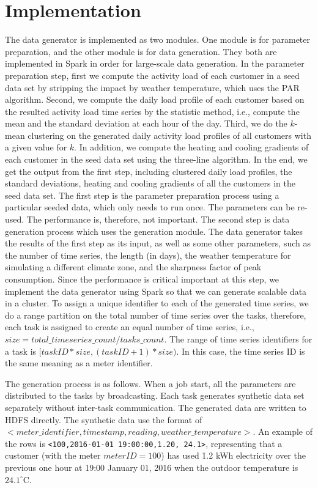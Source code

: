 \documentclass[a4paper,12pt]{llncs}
\newcommand{\ie}{i.e.}
\begin{document}
\section{Implementation}
The data generator is implemented as two modules. One module is for parameter preparation, and the other module is for data generation. They both are implemented in Spark in order for large-scale data generation. In the parameter preparation step, first we compute the activity load of each customer in a seed data set by stripping the impact by weather temperature, which uses the PAR algorithm. Second, we compute the daily load profile of each customer based on the resulted activity load time series by the statistic method, \ie, compute the mean and the standard deviation at each hour of the day. Third, we do the $k$-mean clustering on the generated daily activity load profiles of all customers with a given value for $k$. In addition, we  compute the heating and cooling gradients of each customer in the seed data set using the three-line algorithm. In the end, we get the  output from the first step, including clustered daily load profiles, the standard deviations, heating and cooling gradients of all the customers in the seed data set. The first step is the parameter preparation process using a particular seeded data, which only needs to run once. The parameters can be re-used. The performance is, therefore, not important. The second step is data generation process which uses the  generation module. The data generator takes the results of the first step as its input, as well as some other parameters, such as the number of time series, the length (in days), the weather temperature for simulating a different climate zone, and the sharpness factor of peak consumption.  Since the performance is critical important at this step,  we implement the data generator using Spark so that we can generate scalable data in a cluster. To assign a unique identifier to each of the generated time series, we do a range partition on the total number of time series over the tasks, therefore, each task is assigned to create an equal number of time series, \ie, $size=total\_timeseries\_count/tasks\_count$. The range of time series identifiers for a task is $[taskID*size, (taskID+1)*size)$. In this case, the time series ID is the same meaning as a meter identifier.

The generation process is as follows. When a job start, all the parameters are distributed to the tasks by broadcasting. Each task generates synthetic data set separately without inter-task communication. The generated data are written to HDFS directly. The synthetic data use the format of $<meter\_identifier, timestamp, reading, weather\_temperature>$. An example of the rows is \texttt{<100,2016-01-01 19:00:00,1.20, 24.1>}, representing that a customer (with the meter $meterID=100$) has used  1.2 kWh electricity over the previous one hour at 19:00 January 01, 2016 when the outdoor temperature is $24.1^{\circ}$C. 
\end{document}
